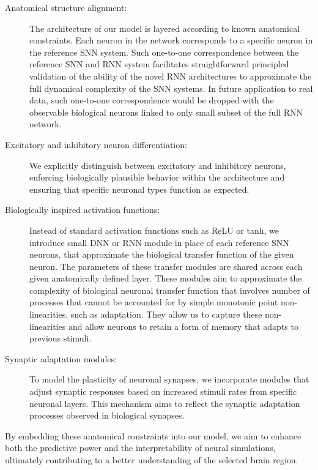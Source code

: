 \begin{description}
\item[Anatomical structure alignment:] The architecture of our
model is layered according to known anatomical constraints. Each
neuron in the network corresponds to a specific neuron in the reference SNN system. 
Such one-to-one correspondence between the reference SNN and RNN system facilitates
straightforward principled validation of the ability of the novel RNN architectures to approximate the full dynamical complexity of the SNN systems. In future application to real data, such one-to-one correspondence would be dropped with the 
observable biological neurons linked to only small subset of the full RNN network.

\item[Excitatory and inhibitory neuron differentiation:] We explicitly
distinguish between excitatory and inhibitory neurons, enforcing
biologically plausible behavior within the architecture and ensuring
that specific neuronal types function as expected.

\item[Biologically inspired activation functions:] Instead of standard
activation functions such as ReLU or tanh, we introduce small 
DNN or RNN module in place of each reference SNN neurons, that approximate the biological transfer function of the given neuron. The parameters of these transfer modules are shared across each given anatomically defined layer. These modules aim to approximate the complexity of biological neuronal transfer function that 
involves number of processes that cannot be accounted for by simple monotonic point non-linearities, such as adaptation. They allow us to capture these non-linearities and allow neurons to retain a form of memory that adapts to previous stimuli.

\item[Synaptic adaptation modules:] To model the plasticity of neuronal
synapses, we incorporate modules that adjust synaptic responses based on
increased stimuli rates from specific neuronal layers. This mechanism aims
to reflect the synaptic adaptation processes observed in biological
synapses.
\end{description}

By embedding these anatomical constraints into our model, we aim to
enhance both the predictive power and the interpretability of neural simulations,
ultimately contributing to a better understanding of the selected brain region.

